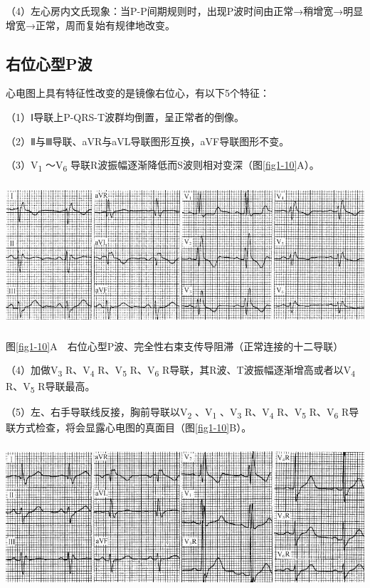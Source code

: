 （4）左心房内文氏现象：当P-P间期规则时，出现P波时间由正常→稍增宽→明显增宽→正常，周而复始有规律地改变。

\protect\hypertarget{text00007.htmlux5cux23subid10}{}{}

\subsection{右位心型P波}

心电图上具有特征性改变的是镜像右位心，有以下5个特征：

（1）Ⅰ导联上P-QRS-T波群均倒置，呈正常者的倒像。

（2）Ⅱ与Ⅲ导联、aVR与aVL导联图形互换，aVF导联图形不变。

（3）V\textsubscript{1} ～V\textsubscript{6}
导联R波振幅逐渐降低而S波则相对变深（图\ref{fig1-10}A）。

\includegraphics[width=5.78125in,height=2.08333in]{./images/Image00015.jpg}

图\ref{fig1-10}A　右位心型P波、完全性右束支传导阻滞（正常连接的十二导联）

（4）加做V\textsubscript{3} R、V\textsubscript{4} R、V\textsubscript{5}
R、V\textsubscript{6}
R导联，其R波、T波振幅逐渐增高或者以V\textsubscript{4}
R、V\textsubscript{5} R导联最高。

（5）左、右手导联线反接，胸前导联以V\textsubscript{2}
、V\textsubscript{1} 、V\textsubscript{3} R、V\textsubscript{4}
R、V\textsubscript{5} R、V\textsubscript{6}
R导联方式检查，将会显露心电图的真面目（图\ref{fig1-10}B）。

\includegraphics[width=5.78125in,height=2.11458in]{./images/Image00016.jpg}

